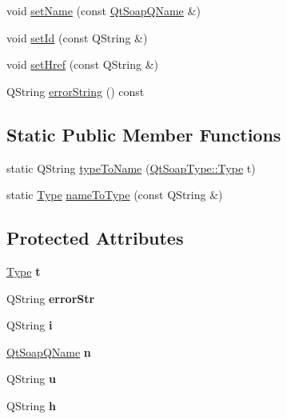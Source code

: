 \begin{DoxyCompactItemize}
\item 
void \mbox{\hyperlink{class_qt_soap_type_adf39954992c8bafcfe750a4922ae1b0e}{set\+Name}} (const \mbox{\hyperlink{class_qt_soap_q_name}{Qt\+Soap\+Q\+Name}} \&)
\item 
void \mbox{\hyperlink{class_qt_soap_type_abee2bc74a4e1b3d16bb6a284b1fe1b35}{set\+Id}} (const Q\+String \&)
\item 
void \mbox{\hyperlink{class_qt_soap_type_a0c652fb427b365660c9e7c450fbdb869}{set\+Href}} (const Q\+String \&)
\item 
Q\+String \mbox{\hyperlink{class_qt_soap_type_ab7f88790ce3629b5a6d86c13e67cfb23}{error\+String}} () const
\end{DoxyCompactItemize}
\subsection*{Static Public Member Functions}
\begin{DoxyCompactItemize}
\item 
static Q\+String \mbox{\hyperlink{class_qt_soap_type_ae224a516e7a3ed8fd7a26263e5af10e2}{type\+To\+Name}} (\mbox{\hyperlink{class_qt_soap_type_a840b69f1d92eeb4e64ae1e0439d54683}{Qt\+Soap\+Type\+::\+Type}} t)
\item 
static \mbox{\hyperlink{class_qt_soap_type_a840b69f1d92eeb4e64ae1e0439d54683}{Type}} \mbox{\hyperlink{class_qt_soap_type_a50fc7724b6261d6428cef2062b21bad7}{name\+To\+Type}} (const Q\+String \&)
\end{DoxyCompactItemize}
\subsection*{Protected Attributes}
\begin{DoxyCompactItemize}
\item 
\mbox{\label{class_qt_soap_type_afaa244ea2707c1405f53b467a045beb1}} 
\mbox{\hyperlink{class_qt_soap_type_a840b69f1d92eeb4e64ae1e0439d54683}{Type}} {\bfseries t}
\item 
\mbox{\label{class_qt_soap_type_a7b6421c3e8e4555009392c7a9b2b46f8}} 
Q\+String {\bfseries error\+Str}
\item 
\mbox{\label{class_qt_soap_type_a30648685bd7ff20c5c8994ce42291b91}} 
Q\+String {\bfseries i}
\item 
\mbox{\label{class_qt_soap_type_aa56381764f41abbd0c70672007373c2f}} 
\mbox{\hyperlink{class_qt_soap_q_name}{Qt\+Soap\+Q\+Name}} {\bfseries n}
\item 
\mbox{\label{class_qt_soap_type_ac86c60b295c361d264eb33563944ef0b}} 
Q\+String {\bfseries u}
\item 
\mbox{\label{class_qt_soap_type_a6636c2f7c34aafe2f8c151d3a7364304}} 
Q\+String {\bfseries h}
\end{DoxyCompactItemize}


